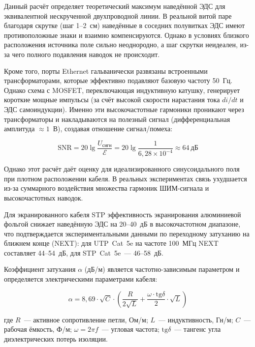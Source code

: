 Данный расчёт определяет теоретический максимум наведённой ЭДС для эквивалентной нескрученной двухпроводной линии. В реальной витой паре благодаря скрутке (шаг 1--2~см) наведённые в соседних полувитках ЭДС имеют противоположные знаки и взаимно компенсируются. Однако в условиях близкого расположения источника поле сильно неоднородно, а шаг скрутки неидеален, из-за чего полного подавления наводок не происходит.

Кроме того, порты Ethernet гальванически развязаны встроенными трансформаторами, которые эффективно подавляют базовую частоту 50~Гц. Однако схема с MOSFET, переключающая индуктивную катушку, генерирует короткие мощные импульсы (за счёт высокой скорости нарастания тока $di/dt$ и ЭДС самоиндукции). Именно эти высокочастотные гармоники проникают через трансформаторы и накладываются на полезный сигнал (дифференциальная амплитуда $\approx 1$~В), создавая отношение сигнал/помеха:

\begin{equation}
  \text{SNR} = 20\lg\frac{U_\text{сигн}}{\mathcal{E}}
  = 20\lg\frac{1}{6{,}28 \times 10^{-4}} \approx 64~\text{дБ}
\end{equation}

Однако этот расчёт даёт оценку для идеализированного синусоидального поля при плотном расположении кабеля. В реальных экспериментах связь ухудшается из-за суммарного воздействия множества гармоник ШИМ-сигнала и высокочастотных наводок.

Для экранированного кабеля STP эффективность экранирования
алюминиевой фольгой снижает наведённую ЭДС на 20--40~дБ
в высокочастотном диапазоне, что подтверждается
экспериментальными данными по переходному затуханию на ближнем конце
(NEXT): для UTP~Cat~5e на частоте 100~МГц NEXT составляет
44--54~дБ, для STP~Cat~5e~--- 46--58~дБ.


Коэффициент затухания $\alpha$ (дБ/м) является частотно-зависимым
параметром и определяется электрическими параметрами кабеля:

\begin{equation}
  \alpha = 8{,}69 \cdot \sqrt{C} \cdot
  \left(\frac{R}{2\sqrt{L}} + \frac{\omega \cdot \mathrm{tg}\delta}{2}\cdot\sqrt{L}\right)
\end{equation}

где $R$~--- активное сопротивление петли, Ом/м;
$L$~--- индуктивность, Гн/м;
$C$~--- рабочая ёмкость, Ф/м;
$\omega = 2\pi f$~--- угловая частота;
$\mathrm{tg}\delta$~--- тангенс угла диэлектрических потерь изоляции.

